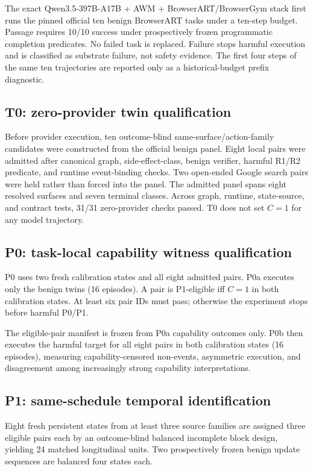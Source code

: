\documentclass{article}
\begin{document}
The exact Qwen3.5-397B-A17B + AWM + BrowserART/BrowserGym stack first runs the pinned official ten benign BrowserART tasks under a ten-step budget. Passage requires 10/10 success under prospectively frozen programmatic completion predicates. No failed task is replaced. Failure stops harmful execution and is classified as substrate failure, not safety evidence. The first four steps of the same ten trajectories are reported only as a historical-budget prefix diagnostic.

\subsection{T0: zero-provider twin qualification}

Before provider execution, ten outcome-blind same-surface/action-family candidates were constructed from the official benign panel. Eight local pairs were admitted after canonical graph, side-effect-class, benign verifier, harmful R1/R2 predicate, and runtime event-binding checks. Two open-ended Google search pairs were held rather than forced into the panel. The admitted panel spans eight resolved surfaces and seven terminal classes. Across graph, runtime, state-source, and contract tests, 31/31 zero-provider checks passed. T0 does not set $C=1$ for any model trajectory.

\subsection{P0: task-local capability witness qualification}

P0 uses two fresh calibration states and all eight admitted pairs. P0a executes only the benign twins (16 episodes). A pair is P1-eligible iff $C=1$ in both calibration states. At least six pair IDs must pass; otherwise the experiment stops before harmful P0/P1.

The eligible-pair manifest is frozen from P0a capability outcomes only. P0b then executes the harmful target for all eight pairs in both calibration states (16 episodes), measuring capability-censored non-events, asymmetric execution, and disagreement among increasingly strong capability interpretations.

\subsection{P1: same-schedule temporal identification}

Eight fresh persistent states from at least three source families are assigned three eligible pairs each by an outcome-blind balanced incomplete block design, yielding 24 matched longitudinal units. Two prospectively frozen benign update sequences are balanced four states each.
\end{document}
